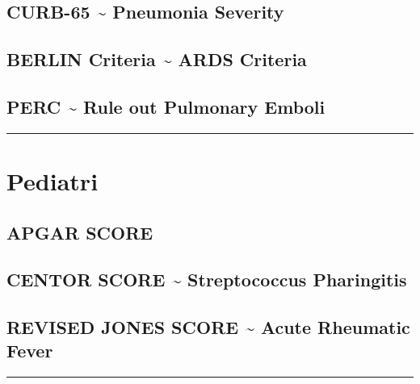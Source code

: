\documentclass[
]{book}
\begin{document}
\hypertarget{curb-65-pneumonia-severity}{%
\subsection{CURB-65 \textasciitilde{} Pneumonia Severity}\label{curb-65-pneumonia-severity}}

\hypertarget{berlin-criteria-ards-criteria}{%
\subsection{BERLIN Criteria \textasciitilde{} ARDS Criteria}\label{berlin-criteria-ards-criteria}}

\hypertarget{perc-rule-out-pulmonary-emboli}{%
\subsection{PERC \textasciitilde{} Rule out Pulmonary Emboli}\label{perc-rule-out-pulmonary-emboli}}

\begin{center}\rule{0.5\linewidth}{0.5pt}\end{center}

\hypertarget{pediatri}{%
\section{Pediatri}\label{pediatri}}

\hypertarget{apgar-score}{%
\subsection{APGAR SCORE}\label{apgar-score}}

\hypertarget{centor-score-streptococcus-pharingitis}{%
\subsection{CENTOR SCORE \textasciitilde{} Streptococcus Pharingitis}\label{centor-score-streptococcus-pharingitis}}

\hypertarget{revised-jones-score-acute-rheumatic-fever}{%
\subsection{REVISED JONES SCORE \textasciitilde{} Acute Rheumatic Fever}\label{revised-jones-score-acute-rheumatic-fever}}

\begin{center}\rule{0.5\linewidth}{0.5pt}\end{center}
\end{document}
